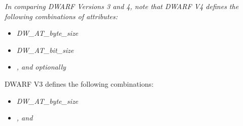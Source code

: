 \textit{In comparing DWARF Versions 3 and 4, note that DWARF V4
defines the following combinations of attributes:}

\begin{itemize}
\item \textit{DW\-\_AT\-\_byte\-\_size}
\item \textit{DW\-\_AT\-\_bit\-\_size}
\item \textit{,  
and optionally }
\end{itemize}
DWARF V3 defines the following combinations:
\begin{itemize}
\item \textit{DW\-\_AT\-\_byte\-\_size}
\item \textit{,  and }
\end{itemize}

